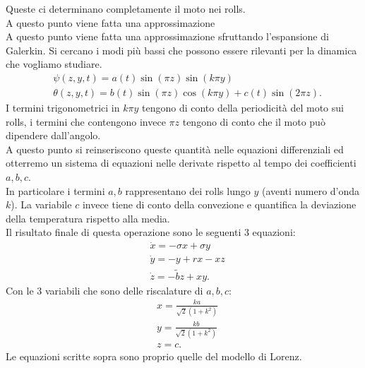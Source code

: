 Queste ci determinano completamente il moto nei rolls.\\
A questo punto viene fatta una approssimazione \\
A questo punto viene fatta una approssimazione sfruttando l'espansione di Galerkin. Si cercano i modi più bassi che possono essere rilevanti per la dinamica che vogliamo studiare.
\[\begin{aligned}
    & \psi (z, y, t) = a(t)\sin (\pi z)\sin (k\pi y)\\
    & \theta (z, y, t) = b(t)\sin (\pi z) \cos (k\pi y) + c(t)\sin (2\pi z)
.\end{aligned}\]
I termini trigonometrici in $k\pi y$ tengono di conto della periodicità del moto sui rolls, i termini che contengono invece $\pi z$  tengono di conto che il moto può dipendere dall'angolo.\\
A questo punto si reinseriscono queste quantità nelle equazioni differenziali ed otterremo un sistema di equazioni nelle derivate rispetto al tempo dei coefficienti $a, b, c$. \\
In particolare i termini $a, b$  rappresentano  dei rolls lungo $y$ (aventi numero d'onda $k$). La variabile $c$ invece tiene di conto della convezione e quantifica la deviazione della temperatura rispetto alla media.\\
Il risultato finale di questa operazione sono le seguenti 3 equazioni:
\[\begin{aligned}
    &\dot{x} = -\sigma x + \sigma  y\\
    &\dot{y} = -y + rx -xz\\
    & \dot{z} = -\tilde{b}z + xy
.\end{aligned}\]
Con le 3 variabili che sono delle riscalature di $a, b ,c$:
\[\begin{aligned}
    & x = \frac{ka}{\sqrt{2} (1+k^2)}\\
    & y = \frac{kb}{\sqrt{2} (1+k^2)}\\
    & z = c
.\end{aligned}\]
Le equazioni scritte sopra sono proprio quelle del modello di Lorenz.
